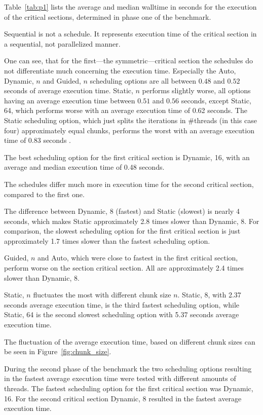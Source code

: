 \documentclass[twoside,11pt]{article}
\begin{document}
Table~\ref{tab:p1} lists the average and median
walltime in seconds for the execution of the critical
sections, determined in phase one of the benchmark.

Sequential is not a schedule. It represents execution time
of the critical section in a sequential, not parallelized
manner.

One can see, that for the first---the symmetric---critical
section the schedules do not differentiate much concerning
the execution time.
Especially the Auto, Dynamic, $n$ and Guided, $n$
scheduling options are all between $0.48$ and $0.52$
seconds of average execution time.
Static, $n$ performs slightly worse, all options having
an average execution time between $0.51$ and $0.56$
seconds, except Static, 64, which performs worse with an
average execution time of 0.62 seconds.
The Static scheduling option, which just splits the
iterations in \#threads (in this case four) approximately
equal chunks, performs the worst with an average execution
time of 0.83 seconds \citep[see][]{lecture}.

The best scheduling option for the first critical section
is Dynamic, 16, with an average and median execution time
of 0.48 seconds.

The schedules differ much more in execution time for
the second critical section, compared to the first one.

The difference between Dynamic, 8 (fastest) and Static
(slowest) is nearly 4 seconds, which makes Static
approximately 2.8 times slower than Dynamic, 8.
For comparison, the slowest scheduling option for
the first critical section is just approximately 1.7 times
slower than the fastest scheduling option.

Guided, $n$ and Auto, which were close to fastest in
the first critical section, perform worse on the
section critical section. All are approximately 2.4 times
slower than Dynamic, 8.

Static, $n$ fluctuates the most with different chunk
size $n$.
Static, 8, with 2.37 seconds average execution time, is
the third fastest scheduling option, while Static, 64
is the second slowest scheduling option with 5.37 seconds
average execution time.

The fluctuation of the average execution time, based
on different chunk sizes can be seen in
Figure~\ref{fig:chunk_size}.

During the second phase of the benchmark the two scheduling
options resulting in the fastest average execution time
were tested with different amounts of threads.
The fastest scheduling option for the first critical
section was Dynamic, 16. For the second critical section
Dynamic, 8 resulted in the fastest average execution time.
\end{document}
